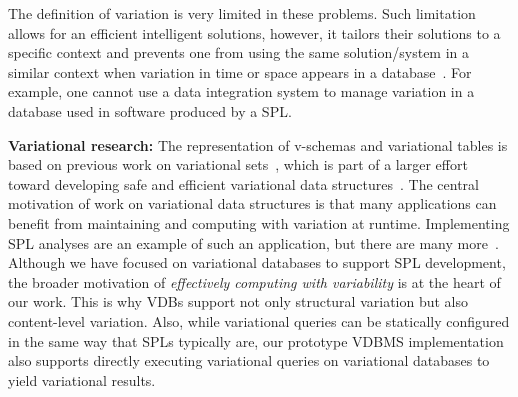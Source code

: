  The definition of variation is very limited in these problems. Such
 limitation allows for an efficient intelligent solutions, however, it tailors
 their solutions to a specific context and prevents one from using the same
 solution/system in a similar context when variation in time or space appears
 in a database~\cite{schVersioningSurvey95Roddick}. For example, one cannot
 use a data integration system to manage variation in a database used in
 software produced by a SPL.


\textbf{Variational research:}
The representation of v-schemas and variational tables is based on
previous work on variational sets~\cite{EWC13fosd}, which is part of a larger
effort toward developing safe and efficient variational data
structures~\cite{Walk14onward,MMWWK17vamos}. The central motivation of work on
variational data structures is that many applications can benefit from
maintaining and computing with variation at runtime. Implementing SPL analyses
are an example of such an application, but there are many
more~\cite{Walk14onward}.
%
Although we have focused on variational databases to support SPL development,
the broader motivation of \emph{effectively computing with variability} is at
the heart of our work. This is why VDBs support not only structural variation
but also content-level variation. Also, while variational queries can be
statically configured in the same way that SPLs typically are, our prototype
VDBMS implementation also supports directly executing variational queries on
variational databases to yield variational results.






